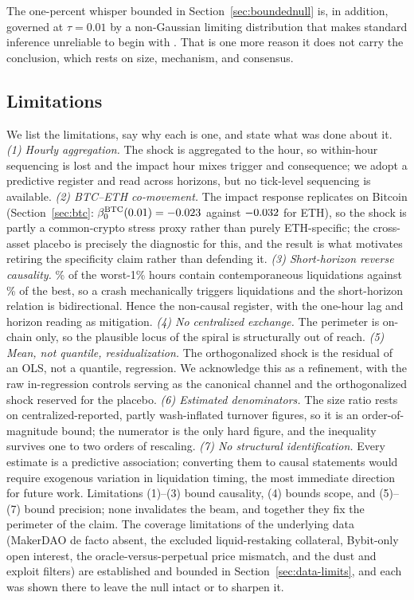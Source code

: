 The one-percent whisper bounded in Section~\ref{sec:boundednull} is, in
addition, governed at $\tau = 0.01$ by a non-Gaussian limiting distribution
that makes standard inference unreliable to begin with
\citep{chernozhukov2005,chernozhukov2011}. That is one more reason it does not
carry the conclusion, which rests on size, mechanism, and consensus.

\subsection{Limitations}
\label{sec:limitations}

We list the limitations, say why each is one, and state what was done about
it. \emph{(1) Hourly aggregation.} The shock is aggregated to the hour, so
within-hour sequencing is lost and the impact hour mixes trigger and
consequence; we adopt a predictive register and read across horizons, but
no tick-level sequencing is available. \emph{(2) BTC--ETH co-movement.} The
impact response replicates on Bitcoin (Section~\ref{sec:btc}:
$\beta^{\text{BTC}}_0(0.01) = -0.023$ against
$-0.032{}$ for ETH), so the shock is partly a common-crypto stress
proxy rather than purely ETH-specific; the cross-asset placebo is precisely
the diagnostic for this, and the result is what motivates retiring the
specificity claim rather than defending it. \emph{(3) Short-horizon reverse
causality.} \PLiqWorstOne\% of the worst-1\% hours contain contemporaneous
liquidations against \PLiqBestOne\% of the best, so a crash mechanically
triggers liquidations and the short-horizon relation is bidirectional. Hence
the non-causal register, with the one-hour lag and horizon reading as
mitigation. \emph{(4) No centralized exchange.} The perimeter is on-chain
only, so the plausible locus of the spiral is structurally out of reach.
\emph{(5) Mean, not quantile, residualization.} The orthogonalized shock is
the residual of an OLS, not a quantile, regression. We acknowledge this as a
refinement, with the raw in-regression controls serving as the canonical
channel and the orthogonalized shock reserved for the placebo.
\emph{(6) Estimated denominators.} The size ratio rests on
centralized-reported, partly wash-inflated turnover figures, so it is an
order-of-magnitude bound; the numerator is the only hard figure, and the
inequality survives one to two orders of rescaling. \emph{(7) No structural
identification.} Every estimate is a predictive association; converting them
to causal statements would require exogenous variation in liquidation
timing, the most immediate direction for future work. Limitations (1)--(3)
bound causality, (4) bounds scope, and (5)--(7) bound precision; none
invalidates the beam, and together they fix the perimeter of the claim. The
coverage limitations of the underlying data (MakerDAO de facto absent, the
excluded liquid-restaking collateral, Bybit-only open interest, the
oracle-versus-perpetual price mismatch, and the dust and exploit filters) are
established and bounded in Section~\ref{sec:data-limits}, and each was shown
there to leave the null intact or to sharpen it.